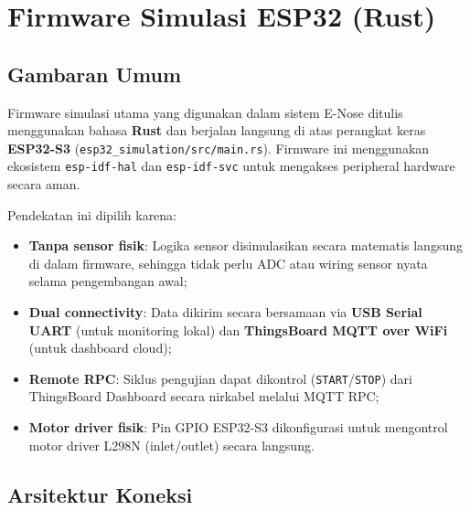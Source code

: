 \documentclass[12pt,a4paper]{report}
\begin{document}
\chapter{Firmware Simulasi ESP32 (Rust)}

\section{Gambaran Umum}

Firmware simulasi utama yang digunakan dalam sistem E-Nose ditulis menggunakan
bahasa \textbf{Rust} dan berjalan langsung di atas perangkat keras
\textbf{ESP32-S3} (\texttt{esp32\_simulation/src/main.rs}). Firmware ini
menggunakan ekosistem \texttt{esp-idf-hal} dan \texttt{esp-idf-svc} untuk
mengakses peripheral hardware secara aman.

Pendekatan ini dipilih karena:
\begin{itemize}[leftmargin=2cm, itemsep=2pt]
  \item \textbf{Tanpa sensor fisik}: Logika sensor disimulasikan secara
        matematis langsung di dalam firmware, sehingga tidak perlu ADC atau
        wiring sensor nyata selama pengembangan awal;
  \item \textbf{Dual connectivity}: Data dikirim secara bersamaan via
        \textbf{USB Serial UART} (untuk monitoring lokal) dan
        \textbf{ThingsBoard MQTT over WiFi} (untuk dashboard cloud);
  \item \textbf{Remote RPC}: Siklus pengujian dapat dikontrol
        (\texttt{START}/\texttt{STOP}) dari ThingsBoard Dashboard secara
        nirkabel melalui MQTT RPC;
  \item \textbf{Motor driver fisik}: Pin GPIO ESP32-S3 dikonfigurasi untuk
        mengontrol motor driver L298N (inlet/outlet) secara langsung.
\end{itemize}

\section{Arsitektur Koneksi}
\end{document}
